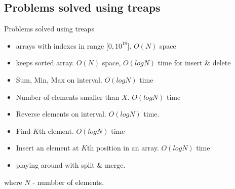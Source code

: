 \documentclass[10pt]{beamer}
\begin{document}
\subsection{Problems solved using treaps}
\begin{frame}
	
	\begin{block}{Problems solved using treaps}
		\begin{itemize}
			\item arrays with indexes in range [$0, 10^{18}$]. $O(N)$ space
			\item keeps sorted array. $O(N)$ space, $O(logN)$ time for insert \& delete
			\item Sum, Min, Max on interval. $O(logN)$ time
			\item Number of elements smaller than $X$. $O(logN)$ time
			\item Reverse elements on interval. $O(logN)$ time.
			\item Find $K$th element. $O(logN)$ time
			\item Insert an element at $K$th position in an array. $O(logN)$ time
			\item playing around with split \& merge.
		\end{itemize}
		
		where $N$ - numbber of elements.
		
	\end{block}
\end{frame}
\end{document}
